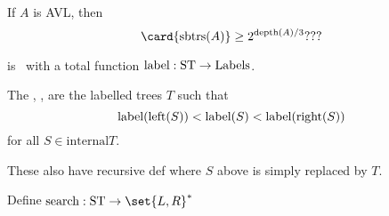 \begin{lemma}\label{}
If $A$ is AVL, then
\[
\card{\subtr{A}} \geq 2^{\text{depth}(A)/3}???
\]
\end{lemma}

\begin{definition}
 is \sharetree\ with a total function
$\text{label}:\text{ST} \to \text{Labels}$.

The , \Searcht, are the labelled trees $T$ such that
\[
\text{label}(\text{left}(S)) < \text{label}(S) < \text{label}(\text{right}(S))
\]
for all $S \in \text{internal}{T}$.
\end{definition}

These also have recursive def where $S$ above is simply replaced by
$T$.

Define $\text{search}: \Searcht \to \set{L,R}^*$


  \endinput
